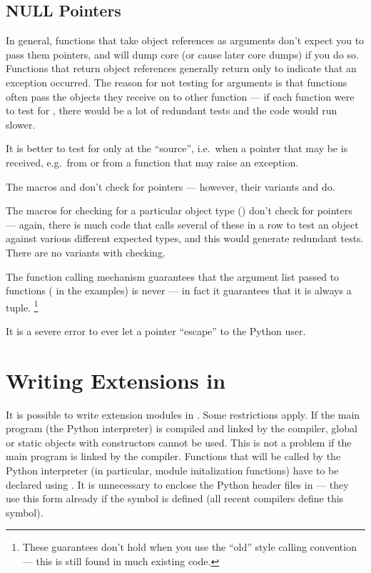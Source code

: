 \documentclass[twoside,openright]{report}
\begin{document}
\subsection{NULL Pointers}

In general, functions that take object references as arguments don't
expect you to pass them \NULL{} pointers, and will dump core (or
cause later core dumps) if you do so.  Functions that return object
references generally return \NULL{} only to indicate that an
exception occurred.  The reason for not testing for \NULL{}
arguments is that functions often pass the objects they receive on to
other function --- if each function were to test for \NULL{},
there would be a lot of redundant tests and the code would run slower.

It is better to test for \NULL{} only at the ``source'', i.e.\
when a pointer that may be \NULL{} is received, e.g.\ from
 or from a function that may raise an exception.

The macros  and 
don't check for \NULL{} pointers --- however, their variants
 and  do.

The macros for checking for a particular object type
() don't check for \NULL{} pointers ---
again, there is much code that calls several of these in a row to test
an object against various different expected types, and this would
generate redundant tests.  There are no variants with \NULL{}
checking.

The \C{} function calling mechanism guarantees that the argument list
passed to \C{} functions (\code{args} in the examples) is never
\NULL{} --- in fact it guarantees that it is always a tuple.%
\footnote{These guarantees don't hold when you use the ``old'' style
calling convention --- this is still found in much existing code.}

It is a severe error to ever let a \NULL{} pointer ``escape'' to
the Python user.  


\section{Writing Extensions in \Cpp{}}

It is possible to write extension modules in \Cpp{}.  Some restrictions
apply.  If the main program (the Python interpreter) is compiled and
linked by the \C{} compiler, global or static objects with constructors
cannot be used.  This is not a problem if the main program is linked
by the \Cpp{} compiler.  Functions that will be called by the
Python interpreter (in particular, module initalization functions)
have to be declared using \code{extern "C"}.
It is unnecessary to enclose the Python header files in
 --- they use this form already if the symbol
\samp{__cplusplus} is defined (all recent \Cpp{} compilers define this
symbol).
\end{document}
